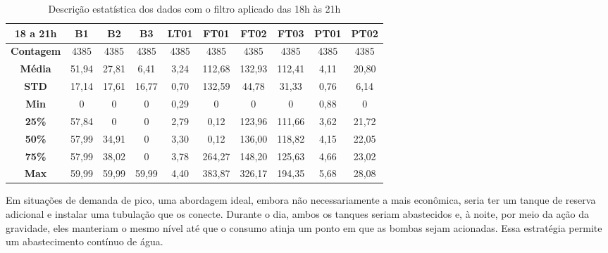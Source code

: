 \begin{table}[!htb]
	\centering
	\caption{Descrição estatística dos dados com o filtro aplicado das 18h às 21h}\label{tb:est}
	\begin{tabular}{@{}cccccccccc@{}}
		\toprule
		\textbf{18 a 21h}  & \textbf{B1} & \textbf{B2} & \textbf{B3} & \textbf{LT01} & \textbf{FT01} & \textbf{FT02} & \textbf{FT03} & \textbf{PT01} & \textbf{PT02} \\ \midrule
		\textbf{Contagem} & 4385    & 4385     & 4385     & 4385      & 4385       & 4385       & 4385       & 4385       & 4385       \\
		\textbf{Média}      & 51,94       & 27,81       & 6,41        & 3,24          & 112,68        & 132,93        & 112,41        & 4,11          & 20,80         \\
		\textbf{STD}       & 17,14       & 17,61       & 16,77       & 0,70          & 132,59        & 44,78         & 31,33         & 0,76          & 6,14          \\
		\textbf{Min}       & 0           & 0           & 0           & 0,29          & 0             & 0             & 0             & 0,88          & 0             \\
		\textbf{25\%}      & 57,84       & 0           & 0           & 2,79          & 0,12          & 123,96        & 111,66        & 3,62          & 21,72         \\
		\textbf{50\%}      & 57,99       & 34,91       & 0           & 3,30          & 0,12          & 136,00        & 118,82        & 4,15          & 22,05         \\
		\textbf{75\%}      & 57,99       & 38,02       & 0           & 3,78          & 264,27        & 148,20        & 125,63        & 4,66          & 23,02         \\
		\textbf{Max}       & 59,99       & 59,99       & 59,99       & 4,40          & 383,87        & 326,17        & 194,35        & 5,68          & 28,08         \\ \bottomrule
	\end{tabular}
	
	
\end{table}





Em situações de demanda de pico, uma abordagem ideal, embora não necessariamente a mais econômica, seria ter um tanque de reserva adicional e instalar uma tubulação que os conecte. Durante o dia, ambos os tanques seriam abastecidos e, à noite, por meio da ação da gravidade, eles manteriam o mesmo nível até que o consumo atinja um ponto em que as bombas sejam acionadas. Essa estratégia permite um abastecimento contínuo de água.


